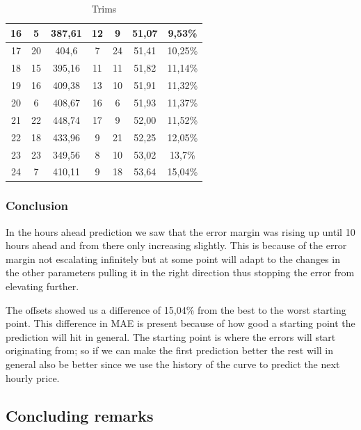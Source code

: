 \begin{table}[H]
{\begin{tabular}{|c|c|c|c|c|c|c|}
	16 & 5  & 387,61 & 12 & 9  & 51,07 & 9,53\% \\ \hline
	17 & 20 & 404,6  & 7  & 24 & 51,41 & 10,25\% \\ \hline
	18 & 15 & 395,16 & 11 & 11 & 51,82 & 11,14\% \\ \hline
	19 & 16 & 409,38 & 13 & 10 & 51,91 & 11,32\% \\ \hline
	20 & 6  & 408,67 & 16 & 6  & 51,93 & 11,37\% \\ \hline
	21 & 22 & 448,74 & 17 & 9  & 52,00 & 11,52\% \\ \hline
	22 & 18 & 433,96 & 9  & 21 & 52,25 & 12,05\% \\ \hline
	23 & 23 & 349,56 & 8  & 10 & 53,02 & 13,7\% \\ \hline
	24 & 7  & 410,11 & 9  & 18 & 53,64 & 15,04\% \\ \hline
	\end{tabular}
}
\caption{Trims} %
\label{table:XHoursAhead} %
\end{table}

\subsubsection{Conclusion}
In the hours ahead prediction we saw that the error margin was rising up until 10 hours ahead and from there only increasing slightly. This is because of the error margin not escalating infinitely but at some point will adapt to the changes in the other parameters pulling it in the right direction thus stopping the error from elevating further.

The offsets showed us a difference of 15,04\% from the best to the worst starting point. This difference in MAE is present because of how good a starting point the prediction will hit in general. The starting point is where the errors will start originating from; so if we can make the first prediction better the rest will in general also be better since we use the history of the curve to predict the next hourly price.

\subsection{Concluding remarks}


